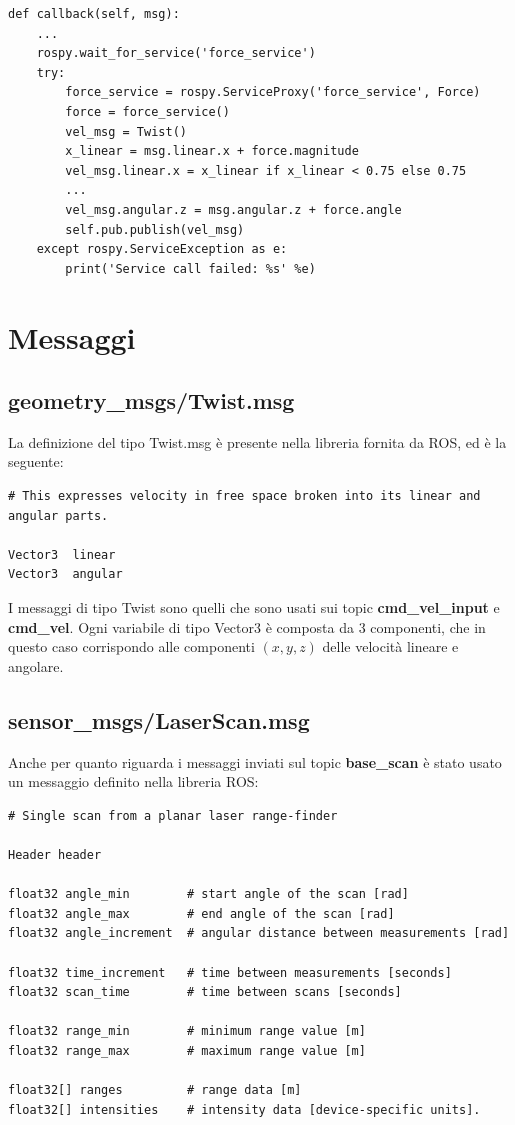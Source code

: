 \documentclass[Lau, binding=0.6cm, oneside]{sapthesis}
\begin{document}
\begin{lstlisting}
def callback(self, msg):
    ...
    rospy.wait_for_service('force_service')
    try:
        force_service = rospy.ServiceProxy('force_service', Force)
        force = force_service()
        vel_msg = Twist()
        x_linear = msg.linear.x + force.magnitude
        vel_msg.linear.x = x_linear if x_linear < 0.75 else 0.75
        ...
        vel_msg.angular.z = msg.angular.z + force.angle
        self.pub.publish(vel_msg)
    except rospy.ServiceException as e:
        print('Service call failed: %s' %e)
\end{lstlisting}

\section{Messaggi}
\subsection{geometry\_msgs/Twist.msg}
La definizione del tipo Twist.msg è presente nella libreria fornita da ROS, ed è la seguente\cite{fonte5}:
\begin{lstlisting}
# This expresses velocity in free space broken into its linear and angular parts.

Vector3  linear
Vector3  angular
\end{lstlisting}
I messaggi di tipo Twist sono quelli che sono usati sui topic \textbf{cmd\_vel\_input} e \textbf{cmd\_vel}.
Ogni variabile di tipo Vector3 è composta da 3 componenti, che in questo caso corrispondo alle componenti  $(x, y, z)$ delle velocità lineare e angolare.

\subsection{sensor\_msgs/LaserScan.msg}
Anche per quanto riguarda i messaggi inviati sul topic \textbf{base\_scan} è stato usato un messaggio definito nella libreria ROS\cite{fonte6}:
\begin{lstlisting}
# Single scan from a planar laser range-finder

Header header

float32 angle_min        # start angle of the scan [rad]
float32 angle_max        # end angle of the scan [rad]
float32 angle_increment  # angular distance between measurements [rad]

float32 time_increment   # time between measurements [seconds]
float32 scan_time        # time between scans [seconds]

float32 range_min        # minimum range value [m]
float32 range_max        # maximum range value [m]

float32[] ranges         # range data [m]
float32[] intensities    # intensity data [device-specific units].
\end{lstlisting}
\end{document}
